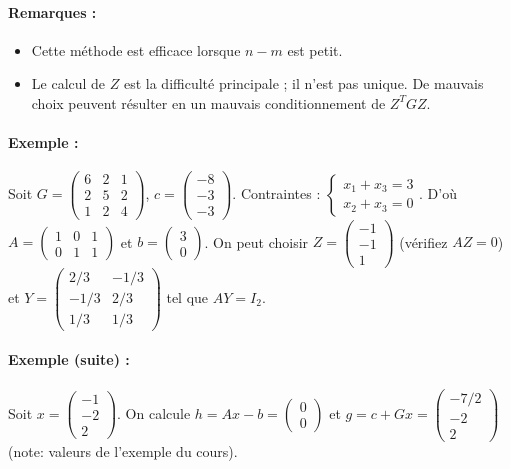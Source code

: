 \paragraph{Remarques :}
\begin{itemize}
    \item Cette méthode est efficace lorsque $n-m$ est petit.
    \item Le calcul de $Z$ est la difficulté principale ; il n'est pas unique. De mauvais choix peuvent résulter en un mauvais conditionnement de $Z^T G Z$.
\end{itemize}

\paragraph{Exemple :}
Soit $G = \begin{pmatrix} 6 & 2 & 1 \\ 2 & 5 & 2 \\ 1 & 2 & 4 \end{pmatrix}$, $c = \begin{pmatrix} -8 \\ -3 \\ -3 \end{pmatrix}$. Contraintes : $\begin{cases} x_1 + x_3 = 3 \\ x_2 + x_3 = 0 \end{cases}$.
D'où $A = \begin{pmatrix} 1 & 0 & 1 \\ 0 & 1 & 1 \end{pmatrix}$ et $b = \begin{pmatrix} 3 \\ 0 \end{pmatrix}$.
On peut choisir $Z = \begin{pmatrix} -1 \\ -1 \\ 1 \end{pmatrix}$ (vérifiez $AZ=0$) et $Y = \begin{pmatrix} 2/3 & -1/3 \\ -1/3 & 2/3 \\ 1/3 & 1/3 \end{pmatrix}$ tel que $AY = I_2$.

\paragraph{Exemple (suite) :}
Soit $x = \begin{pmatrix} -1 \\ -2 \\ 2 \end{pmatrix}$.
On calcule $h = Ax - b = \begin{pmatrix} 0 \\ 0 \end{pmatrix}$ et $g = c + Gx = \begin{pmatrix} -7/2 \\ -2 \\ 2 \end{pmatrix}$ (note: valeurs de l'exemple du cours).


